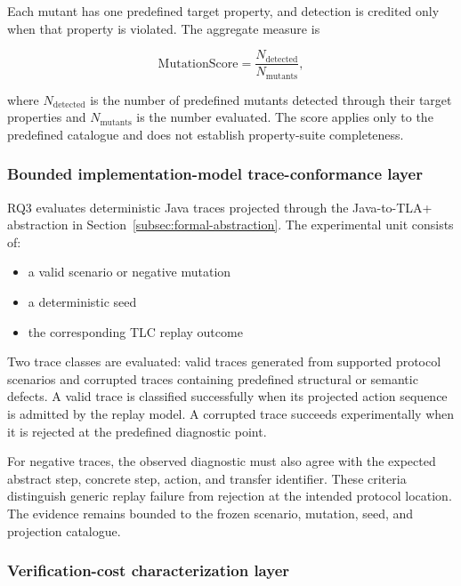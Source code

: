 Each mutant has one predefined target property, and detection is credited only
when that property is violated. The aggregate measure is

\begin{equation}
\mathrm{MutationScore}
=
\frac{N_{\mathrm{detected}}}
{N_{\mathrm{mutants}}},
\label{eq:mutation-score}
\end{equation}

where \(N_{\mathrm{detected}}\) is the number of predefined mutants detected
through their target properties and \(N_{\mathrm{mutants}}\) is the number
evaluated. The score applies only to the predefined catalogue and does not
establish property-suite completeness.

\subsubsection{Bounded implementation-model trace-conformance layer}

RQ3 evaluates deterministic Java traces projected through the Java-to-TLA+
abstraction in Section~\ref{subsec:formal-abstraction}. The experimental unit
consists of:

\begin{itemize}
\item a valid scenario or negative mutation
\item a deterministic seed
\item the corresponding TLC replay outcome
\end{itemize}

Two trace classes are evaluated: valid traces generated from supported protocol
scenarios and corrupted traces containing predefined structural or semantic
defects. A valid trace is classified successfully when its projected action
sequence is admitted by the replay model. A corrupted trace succeeds
experimentally when it is rejected at the predefined diagnostic point.

For negative traces, the observed diagnostic must also agree with the expected
abstract step, concrete step, action, and transfer identifier. These criteria
distinguish generic replay failure from rejection at the intended protocol
location. The evidence remains bounded to the frozen scenario, mutation, seed,
and projection catalogue.

\subsubsection{Verification-cost characterization layer}

